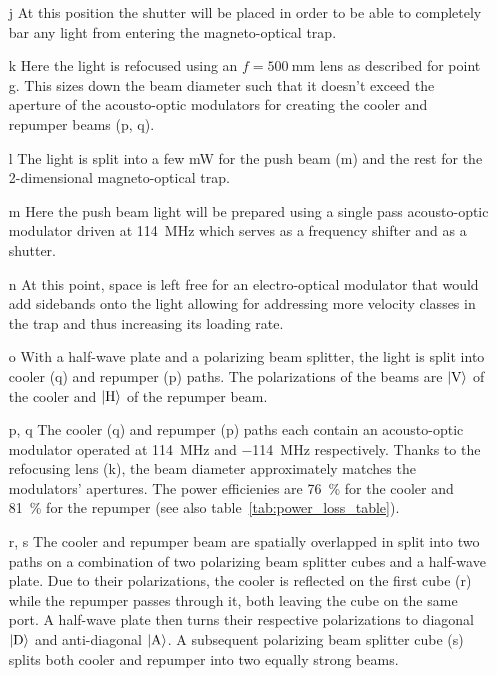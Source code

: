\begin{itemize}
    \item[j] At this position the shutter will be placed in order to be able to completely bar any light from entering the magneto-optical trap.
    
    \item[k] Here the light is refocused using an $f = \SI{500}{\milli\meter}$ lens as described for point g. This sizes down the beam diameter such that it doesn't exceed the aperture of the acousto-optic modulators for creating the cooler and repumper beams (p, q).
    
    \item[l] The light is split into a few \si{\milli\watt} for the push beam (m) and the rest for the 2-dimensional magneto-optical trap.

    \item[m] Here the push beam light will be prepared using a single pass acousto-optic modulator driven at \SI{+114}{\mega\hertz} which serves as a frequency shifter and as a shutter.
    
    \item[n] At this point, space is left free for an electro-optical modulator that would add sidebands onto the light allowing for addressing more velocity classes in the trap and thus increasing its loading rate.
    
    \item[o] With a half-wave plate and a polarizing beam splitter, the light is split into cooler (q) and repumper (p) paths. The polarizations of the beams are $\Ket{\text{V}}$ of the cooler and $\Ket{\text{H}}$ of the repumper beam.
    
    \item[p, q] The cooler (q) and repumper (p) paths each contain an acousto-optic modulator operated at \SI{+114}{\mega\hertz} and \SI{-114}{\mega\hertz} respectively. Thanks to the refocusing lens (k), the beam diameter approximately matches the modulators' apertures. The power efficienies are \SI{76}{\percent} for the cooler and \SI{81}{\percent} for the repumper (see also table~\ref{tab:power_loss_table}).
    
    \item[r, s] The cooler and repumper beam are spatially overlapped in split into two paths on a combination of two polarizing beam splitter cubes and a half-wave plate. Due to their polarizations, the cooler is reflected on the first cube (r) while the repumper passes through it, both leaving the cube on the same port. A half-wave plate then turns their respective polarizations to diagonal $\Ket{\text{D}}$ and anti-diagonal $\Ket{\text{A}}$. A subsequent polarizing beam splitter cube (s) splits both cooler and repumper into two equally strong beams.
    

\end{itemize}
